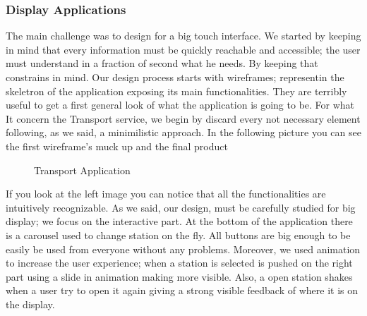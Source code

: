 \documentclass[]{usiinfbachelorproject}
\begin{document}
\subsubsection{Display Applications}
The main challenge was to design for a big touch interface. We started by keeping in mind that every information must be quickly reachable and accessible; the user must understand in a fraction of second what he needs. By keeping that constrains in mind.
Our design process starts with wireframes; representin the skeletron of the application exposing its main functionalities. They are terribly useful to get a first general look of what the application is going to be. For what It concern the Transport service, we begin by discard every not necessary element following, as we said, a minimilistic approach. In the following picture you can see the first wireframe's muck up and the final product
\begin{figure}[H]
  \centering
  \hfill
  \caption{Transport Application}
\end{figure} 
If you look at the left image you can notice that all the functionalities are intuitively recognizable. As we said, our design, must be carefully studied for big display; we focus on the interactive part.
At the bottom of the application there is a carousel used to change station on the fly. All buttons are big enough to be easily be used from everyone without any problems.
Moreover, we used animation to increase the user experience; when a station is selected is pushed on the right part using a slide in animation making more visible. Also, a open station shakes when a user try to open it again giving a strong visible feedback of where it is on the display. 
\end{document}
